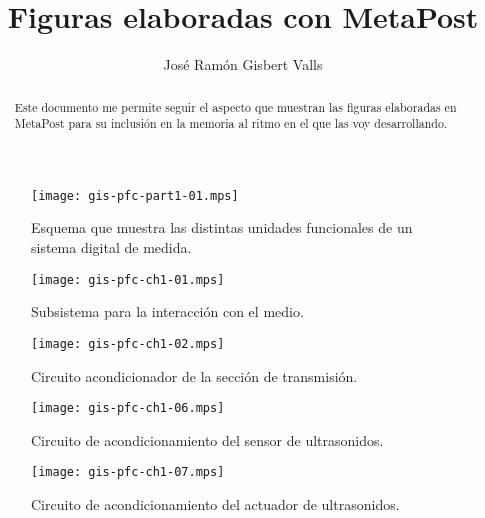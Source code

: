 \documentclass[a4paper,12pt]				{article}
\title{Figuras elaboradas con MetaPost}
\author{José Ramón Gisbert Valls}
\begin{document}
\maketitle{}

\begin{abstract}
	Este documento me permite seguir el aspecto que muestran las
	figuras elaboradas en MetaPost para su inclusión en la memoria al
	ritmo en el que las voy desarrollando.
\end{abstract}

\listoffigures

\begin{figure}
	\begin{center}
		\texttt{[image: gis-pfc-part1-01.mps]}
	\end{center}
	\caption[Sistema digital de medida]{Esquema que muestra las
	distintas unidades funcionales de un sistema digital de medida.}
	\label{fig:digmeasstm}
\end{figure}

\begin{figure}
	\begin{center}
		\texttt{[image: gis-pfc-ch1-01.mps]}
	\end{center}
	\caption[Subsistema para la interacción con el medio]{Subsistema
	para la interacción con el medio.}
	\label{fig:submedium}
\end{figure}

\begin{figure}
	\begin{center}
		\texttt{[image: gis-pfc-ch1-02.mps]}
	\end{center}
	\caption[Circuito acondicionador de la sección de
	transmisión]{Circuito acondicionador de la sección de transmisión.}
	\label{fig:txconditioner}
\end{figure}

\begin{figure}
	\begin{center}
		\texttt{[image: gis-pfc-ch1-06.mps]}
	\end{center}
	\caption[Circuito de acondicionamiento del sensor
	piezoeléctrico]{Circuito de acondicionamiento del sensor de
	ultrasonidos.}
	\label{fig:rxconditioner}
\end{figure}

\clearpage

\begin{figure}
	\begin{center}
		\texttt{[image: gis-pfc-ch1-07.mps]}
	\end{center}
	\caption[Circuito de acondicionamiento del actuador
	piezoeléctrico]{Circuito de acondicionamiento del actuador de
	ultrasonidos.}
	\label{fig:newtxconditioner}
\end{figure}
\end{document}
